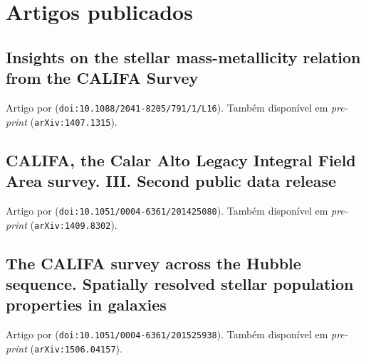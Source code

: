


\chapter{Artigos publicados}

\section{Insights on the stellar mass-metallicity relation from the CALIFA Survey}
\label{apendice:GDetal2014b}

Artigo por \cite{GonzalezDelgado.etal.2014b} (\texttt{doi:10.1088/2041-8205/791/1/L16}).
Também disponível em {\em pre-print} (\texttt{arXiv:1407.1315}).

\cleardoublepage



\section{CALIFA, the Calar Alto Legacy Integral Field Area survey. III. Second public data release}
\label{apendice:GBetal2015a}

Artigo por \cite{GarciaBenito.etal.2015a} (\texttt{doi:10.1051/0004-6361/201425080}).
Também disponível em {\em pre-print} (\texttt{arXiv:1409.8302}).

\cleardoublepage



\section{The CALIFA survey across the Hubble sequence. Spatially resolved stellar population properties in galaxies}
\label{apendice:GDetal2015a}

Artigo por \cite{GonzalezDelgado.etal.2015a} (\texttt{doi:10.1051/0004-6361/201525938}).
Também disponível em {\em pre-print} (\texttt{arXiv:1506.04157}).

\cleardoublepage



